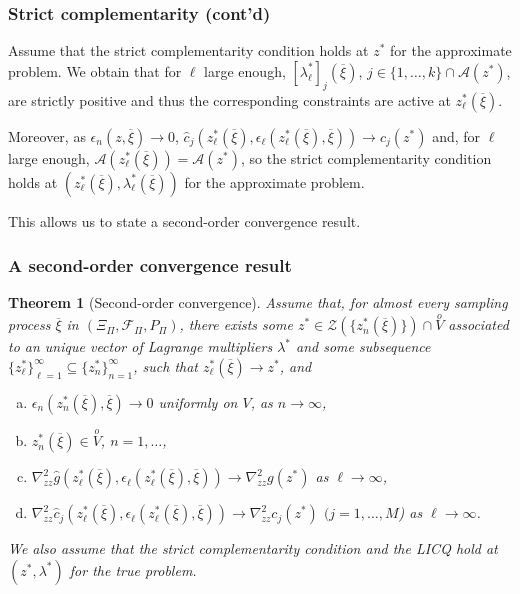 \documentclass{beamer}
\newtheorem{theo}{Theorem}
\begin{document}
\begin{frame}
\frametitle{Strict complementarity (cont'd)}

Assume that the strict complementarity condition holds at $z^*$ for the approximate problem.
We obtain that for $\ell$ large enough,
$[\lambda^*_{\ell}]_j(\overline{\xi})$, $j \in \lbrace 1,\ldots,k
\rbrace \cap \mathcal{A} ( z^* ) $, are strictly positive and thus the corresponding constraints are active at $z^*_{\ell}(\overline{\xi})$.

\mbox{}

Moreover, as $\epsilon_n (z, \overline{\xi} ) \rightarrow 0$,
$\hat{c}_j \left( z^*_{\ell}(\overline{\xi}),
\epsilon_{\ell}(z^*_{\ell}(\overline{\xi}),\overline{\xi}) \right) \rightarrow
c_j ( z^* )$ and, for $\ell$ large enough,
$\mathcal{A} \left( z^*_{\ell}(\overline{\xi}) \right) = \mathcal{A} (
z^* )$, so the strict complementarity condition holds at $\left(
  z^*_{\ell}(\overline{\xi}), \lambda_{\ell}^*(\overline{\xi})
\right)$ for the approximate problem.

\mbox{}

This allows us to state a second-order convergence result.

\end{frame}

\begin{frame}
\frametitle{A second-order convergence result}

\begin{theo}[Second-order convergence]
\label{th:soc}
Assume that, for almost every sampling process $\overline{\xi}$ in $(\Xi_{\Pi}, \mathcal{F}_{\Pi}, P_{\Pi})$, there exists some $z^* \in \mathcal{Z} \left(\lbrace
  z^*_n(\overline{\xi})\rbrace\right) \cap \overset{o}{V}$ associated to an unique vector of Lagrange multipliers $\lambda^*$ and some subsequence $\lbrace z_{\ell}^* \rbrace_{\ell = 1}^{\infty} \subseteq \lbrace  z_n^* \rbrace_{n = 1}^{\infty}$, such that $z^*_{\ell}(\overline{\xi}) \rightarrow z^*$, and
\begin{enumerate}[(a)]
\item
$\epsilon_n \left( z^*_n(\overline{\xi}),\overline{\xi} \right)
  \rightarrow 0$ uniformly on $V$, as $n \rightarrow \infty$,
\item
$z^*_n(\overline{\xi}) \in \overset{o}{V}$, $n = 1,\ldots$,
\item
$\nabla^2_{zz} \hat{g} \left( z^*_{\ell}(\overline{\xi}), 
\epsilon_{\ell}(z^*_{\ell}(\overline{\xi}),\overline{\xi}) \right)
\rightarrow \nabla^2_{zz} g ( z^* )$ as $\ell \rightarrow \infty$,
\item
$\nabla^2_{zz} \hat{c}_j \left( z^*_{\ell}(\overline{\xi}), 
\epsilon_{\ell}(z^*_{\ell}(\overline{\xi}),\overline{\xi}) \right)
\rightarrow \nabla^2_{zz} c_j ( z^* )$ $(j=1,\ldots,M$) as
$\ell \rightarrow \infty$.
\end{enumerate}
We also assume that the strict complementarity condition and the LICQ hold at $( z^*, \lambda^* )$ for the true problem.
\end{theo}

\end{frame}
\end{document}
